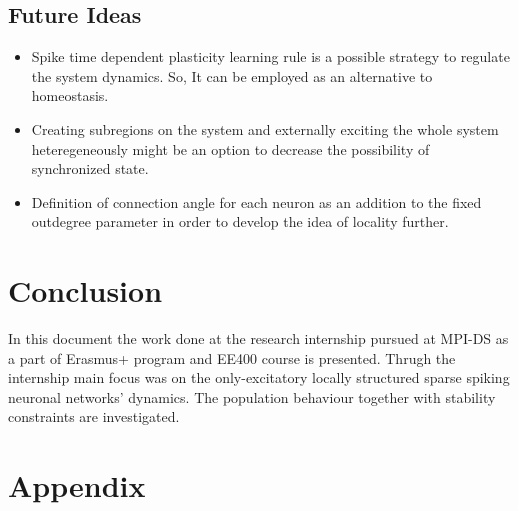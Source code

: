 \documentclass[a4paper,12pt]{article}
\begin{document}
\subsection{Future Ideas}
\begin{itemize}
    \item Spike time dependent plasticity learning rule is a possible strategy to regulate the system dynamics. So, It can be employed as an alternative to homeostasis.
    \item Creating subregions on the system and externally exciting the whole system heteregeneously might be an option to decrease the possibility of synchronized state.
    \item Definition of connection angle for each neuron as an addition to the fixed outdegree parameter in order to develop the idea of locality further.
\end{itemize}
\section{Conclusion}
In this document the work done at the research internship pursued at MPI-DS as a part of Erasmus+ program and EE400 course is presented. Thrugh the internship main focus was on the only-excitatory locally structured sparse spiking neuronal networks' dynamics. The population behaviour together with stability constraints are investigated.
 

\section{Appendix}
\end{document}
